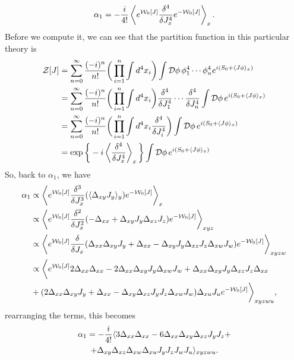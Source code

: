 \begin{equation}
    \alpha_1 = -\frac{i}{4!}\left\langle e^{\mathcal{W}_0[J]}\frac{\delta^4}{\delta J_x^4}e^{-\mathcal{W}_0[J]} \right\rangle_x.
\end{equation}
Before we compute it, we can see that the partition function in this particular theory is 
\begin{equation}
    \begin{split}
        \mathcal{Z}[J] &= \sum_{n=0}^\infty\frac{(-i)^n}{n!}\bigg(\prod_{i=1}^n\int d^4x_i\bigg)\int \mathcal{D}\phi\,\phi^4_1\cdots\phi_n^4 e^{i(S_0 + \langle J\phi \rangle_x)} \\
        &= \sum_{n=0}^\infty\frac{(-i)^n}{n!}\bigg(\prod_{i=1}^n\int d^4x_i\bigg)\frac{\delta^4}{\delta J_1^4}\cdots\frac{\delta^4}{\delta J_n^4}\int \mathcal{D}\phi\,e^{i(S_0 + \langle J\phi \rangle_x)} \\
        &= \sum_{n=0}^\infty\frac{(-i)^n}{n!}\bigg(\prod_{i=1}^n\int d^4x_i\frac{\delta^4}{\delta J_i^4}\bigg)\int \mathcal{D}\phi\,e^{i(S_0 + \langle J\phi \rangle_x)} \\
        &= \exp{\bigg\{-i\left\langle \frac{\delta^4}{\delta J_x^4} \right\rangle_x\bigg\}} \int \mathcal{D}\phi\,e^{i(S_0 + \langle J\phi \rangle_x)}
    \end{split}
\end{equation}
So, back to $\alpha_1$, we have 
\begin{equation}
    \begin{split}
        \alpha_1 &\propto\left\langle e^{\mathcal{W}_0[J]}\frac{\delta^3}{\delta J_x^3}(\langle \Delta_{xy}J_y \rangle_y)e^{-\mathcal{W}_0[J]} \right\rangle_x  \\
        &\propto\left\langle e^{\mathcal{W}_0[J]}\frac{\delta^2}{\delta J_x^2}(-\Delta_{xx} + \Delta_{xy}J_y\Delta_{xz}J_z)e^{-\mathcal{W}_0[J]} \right\rangle_{xyz} \\
        &\propto\bigg\langle e^{\mathcal{W}_0[J]}\frac{\delta}{\delta J_x}(\Delta_{xx}\Delta_{xy}J_y + \Delta_{xx} - \Delta_{xy}J_y\Delta_{xz}J_z\Delta_{xw}J_w)e^{-\mathcal{W}_0[J]}\bigg\rangle_{xyzw} \\
        &\propto\bigg\langle e^{\mathcal{W}_0[J]}2\Delta_{xx}\Delta_{xx} - 2\Delta_{xx}\Delta_{xy}J_y\Delta_{xw}J_w + \Delta_{xx}\Delta_{xy}J_y \Delta_{xz}J_z\Delta_{xx} \\
        &+ (2\Delta_{xx}\Delta_{xy}J_y + \Delta_{xx} - \Delta_{xy}\Delta_{xz}J_yJ_z\Delta_{xw}J_w)\Delta_{xu}J_ue^{-\mathcal{W}_0[J]}\bigg\rangle_{xyzwu},
    \end{split}
\end{equation}
rearranging the terms, this becomes 
\begin{multline}
    \alpha_1 = -\frac{i}{4!}\langle 3\Delta_{xx}\Delta_{xx} - 6\Delta_{xx}\Delta_{xy}\Delta_{xz}J_yJ_z + \\ + \Delta_{xy}\Delta_{xz}\Delta_{xw}\Delta_{xu}J_yJ_zJ_wJ_u \rangle_{xyzwu}.
\end{multline}
